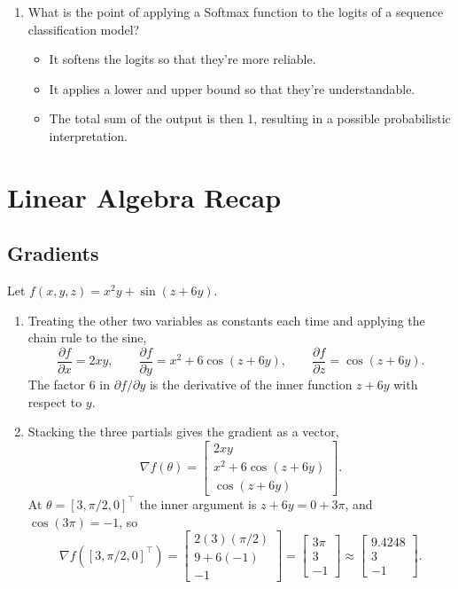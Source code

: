 \documentclass[11pt]{article}
\begin{document}
\begin{enumerate}
  \item What is the point of applying a Softmax function to the logits of a sequence classification model?
        \begin{itemize}
          \item[{[\ ]}] It softens the logits so that they're more reliable.
          \item[{[\ ]}] It applies a lower and upper bound so that they're understandable.
          \item[{[X]}] The total sum of the output is then 1, resulting in a possible probabilistic
                interpretation.
        \end{itemize}

\end{enumerate}

\section{Linear Algebra Recap}

\subsection{Gradients}

Let $f(x,y,z) = x^2 y + \sin(z + 6y)$.

\begin{enumerate}
  \item Treating the other two variables as constants each time and applying the chain rule to the sine,
        \[
          \frac{\partial f}{\partial x} = 2xy, \qquad
          \frac{\partial f}{\partial y} = x^2 + 6\cos(z + 6y), \qquad
          \frac{\partial f}{\partial z} = \cos(z + 6y).
        \]
        The factor 6 in $\partial f/\partial y$ is the derivative of the inner function $z + 6y$ with
        respect to $y$.

  \item Stacking the three partials gives the gradient as a vector,
        \[
          \nabla f(\theta) =
          \begin{bmatrix}
            2xy \\ x^2 + 6\cos(z+6y) \\ \cos(z+6y)
          \end{bmatrix}.
        \]
        At $\theta = [3, \pi/2, 0]^\top$ the inner argument is $z + 6y = 0 + 3\pi$, and
        $\cos(3\pi) = -1$, so
        \[
          \nabla f([3,\pi/2,0]^\top) =
          \begin{bmatrix} 2(3)(\pi/2) \\ 9 + 6(-1) \\ -1 \end{bmatrix}
          = \begin{bmatrix} 3\pi \\ 3 \\ -1 \end{bmatrix}
          \approx \begin{bmatrix} 9.4248 \\ 3 \\ -1 \end{bmatrix}.
        \]
\end{enumerate}
\end{document}
